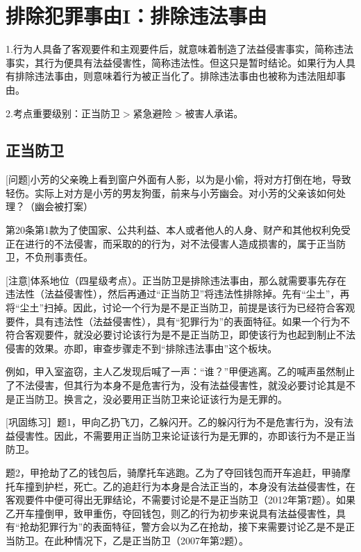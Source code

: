 \chapter{排除犯罪事由I：排除违法事由}

\begin{EditionOpeningPanel}
1.行为人具备了客观要件和主观要件后，就意味着制造了法益侵害事实，简称违法事实，其行为便具有法益侵害性，简称违法性。但这只是暂时结论。如果行为人具有排除违法事由，则意味着行为被正当化了。排除违法事由也被称为违法阻却事由。

2.考点重要级别：正当防卫\ensuremath{>}紧急避险\ensuremath{>}被害人承诺。
\end{EditionOpeningPanel}

\section{正当防卫}

[问题]小芳的父亲晚上看到窗户外面有人影，以为是小偷，将对方打倒在地，导致轻伤。实际上对方是小芳的男友狗蛋，前来与小芳幽会。对小芳的父亲该如何处理？（幽会被打案）

第20条第1款为了使国家、公共利益、本人或者他人的人身、财产和其他权利免受正在进行的不法侵害，而采取的的行为，对不法侵害人造成损害的，属于正当防卫，不负刑事责任。


[注意]体系地位（四星级考点）。正当防卫是排除违法事由，那么就需要事先存在违法性（法益侵害性），然后再通过“正当防卫”将违法性排除掉。先有“尘土”，再将“尘土”扫掉。因此，讨论一个行为是不是正当防卫，前提是该行为已经符合客观要件，具有违法性（法益侵害性），具有“犯罪行为”的表面特征。如果一个行为不符合客观要件，就没必要讨论该行为是不是正当防卫，即使该行为也起到制止不法侵害的效果。亦即，审查步骤走不到“排除违法事由”这个板块。

例如，甲入室盗窃，主人乙发现后喊了一声：“谁？”甲便逃离。乙的喊声虽然制止了不法侵害，但其行为本身不是危害行为，没有法益侵害性，就没必要讨论其是不是正当防卫。换言之，没必要用正当防卫来论证该行为是无罪的。

[巩固练习］题1，甲向乙扔飞刀，乙躲闪开。乙的躲闪行为不是危害行为，没有法益侵害性。因此，不需要用正当防卫来论证该行为是无罪的，亦即该行为不是正当防卫。

题2，甲抢劫了乙的钱包后，骑摩托车逃跑。乙为了夺回钱包而开车追赶，甲骑摩托车撞到护栏，死亡。乙的追赶行为本身是合法正当的，本身没有法益侵害性，在客观要件中便可得出无罪结论，不需要讨论是不是正当防卫（2012年第7题）。如果乙开车撞倒甲，致甲重伤，夺回钱包，则乙的行为初步来说具有法益侵害性，具有“抢劫犯罪行为”的表面特征，警方会以为乙在抢劫，接下来需要讨论乙是不是正当防卫。在此种情况下，乙是正当防卫（2007年第2题）。

